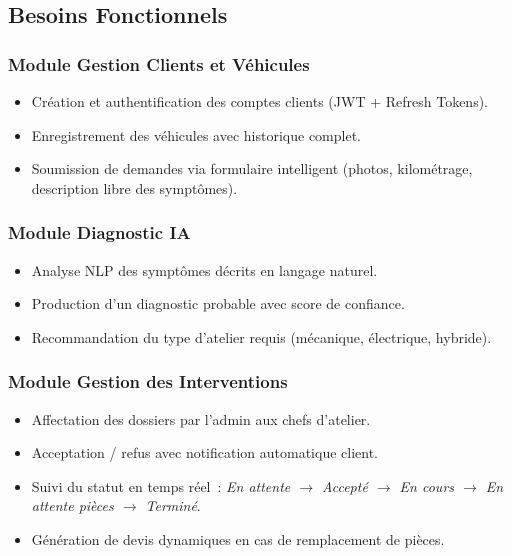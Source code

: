 \documentclass[12pt,a4paper]{report}
\begin{document}
\subsection{Besoins Fonctionnels}

\subsubsection{Module Gestion Clients et V\'{e}hicules}
\begin{itemize}
  \item Cr\'{e}ation et authentification des comptes clients
    (JWT + Refresh Tokens).
  \item Enregistrement des v\'{e}hicules avec historique complet.
  \item Soumission de demandes via formulaire intelligent
    (photos, kilom\'{e}trage, description libre des sympt\^{o}mes).
\end{itemize}

\subsubsection{Module Diagnostic IA}
\begin{itemize}
  \item Analyse NLP des sympt\^{o}mes d\'{e}crits en langage naturel.
  \item Production d'un diagnostic probable avec score de confiance.
  \item Recommandation du type d'atelier requis
    (m\'{e}canique, \'{e}lectrique, hybride).
\end{itemize}

\subsubsection{Module Gestion des Interventions}
\begin{itemize}
  \item Affectation des dossiers par l'admin aux chefs d'atelier.
  \item Acceptation / refus avec notification automatique client.
  \item Suivi du statut en temps r\'{e}el~:
    \textit{En attente $\rightarrow$ Accept\'{e} $\rightarrow$ En cours
    $\rightarrow$ En attente pi\`{e}ces $\rightarrow$ Termin\'{e}}.
  \item G\'{e}n\'{e}ration de devis dynamiques en cas de remplacement
    de pi\`{e}ces.
\end{itemize}
\end{document}
